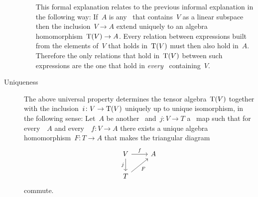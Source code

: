 \begin{recall}
\begin{description}
\begin{itemize}
          This formal explanation relates to the previous informal explanation in the following way:
          If~$A$ is any~{\algebra{$\kf$}} that contains~$V$ as a linear subspace then the inclusion~$V \to A$ extend uniquely to an algebra homomorphism~$\operatorname{T}(V) \to A$.
          Every relation between expressions built from the elements of~$V$ that holds in~$\operatorname{T}(V)$ must then also hold in~$A$.
          Therefore the only relations that hold in~$\operatorname{T}(V)$ between such expressions are the one that hold in \emph{every}~{\algebra{$\kf$}} containing~$V$.
      \end{itemize}
      
    \item[Uniqueness]
      The above universal property determines the tensor algebra~$\operatorname{T}(V)$ together with the inclusion~$i \colon V \to \operatorname{T}(V)$ uniquely up to unique isomorphism, in the following sense:
      Let~$A$ be another~{\algebra{$\kf$}} and~$j \colon V \to T$ a~{\linear{$\kf$}} map such that for every~{\algebra{$\kf$}}~$A$ and every~{\linear{$\kf$}}~$f \colon V \to A$ there exists a unique algebra homomorphism~$F \colon T \to A$ that makes the triangular diagram
      \[
        \begin{tikzcd}
          V
          \arrow{r}[above]{f}
          \arrow{d}[left]{j}
          &
          A
          \\
          T
          \arrow{ur}[below right]{F}
          &
          {}
        \end{tikzcd}
      \]
      commute.
      

\end{description}
\end{recall}
